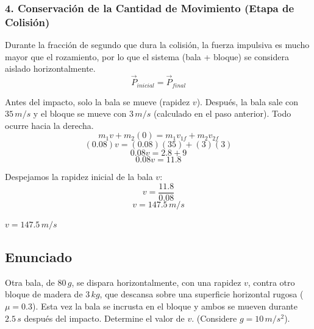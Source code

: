 \documentclass[12pt, a4paper]{article}
\begin{document}
\subsubsection*{4. Conservación de la Cantidad de Movimiento (Etapa de Colisión)}
Durante la fracción de segundo que dura la colisión, la fuerza impulsiva es mucho mayor que el rozamiento, por lo que el sistema (bala + bloque) se considera aislado horizontalmente.
\[ \vec{P}_{inicial} = \vec{P}_{final} \]

Antes del impacto, solo la bala se mueve (rapidez $v$). Después, la bala sale con $35 \, \si{m/s}$ y el bloque se mueve con $3 \, \si{m/s}$ (calculado en el paso anterior). Todo ocurre hacia la derecha.
\[ m_1 v + m_2 (0) = m_1 v_{1f} + m_2 v_{2f} \]
\[ (0.08) v = (0.08)(35) + (3)(3) \]
\[ 0.08 v = 2.8 + 9 \]
\[ 0.08 v = 11.8 \]

Despejamos la rapidez inicial de la bala $v$:
\[ v = \frac{11.8}{0.08} \]
\[ v = 147.5 \, \si{m/s} \]

\begin{tcolorbox}[colback=green!5!white, colframe=green!50!black, title=Respuesta Final]
\centering \Large $v = 147.5 \, \si{m/s}$
\end{tcolorbox}

\newpage

\subsection*{Enunciado}
Otra bala, de $80 \, \si{g}$, se dispara horizontalmente, con una rapidez $v$, contra otro bloque de madera de $3 \, \si{kg}$, que descansa sobre una superficie horizontal rugosa ($\mu = 0.3$). Esta vez la bala se incrusta en el bloque y ambos se mueven durante $2.5 \, \si{s}$ después del impacto. Determine el valor de $v$. (Considere $g = 10 \, \si{m/s^2}$).

\begin{center}
\end{center}
\end{document}
